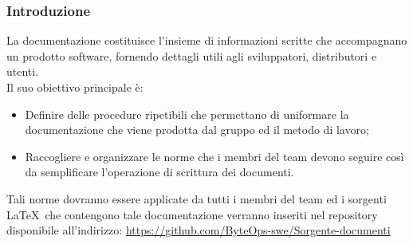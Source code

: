 \documentclass{article}
\begin{document}
    \subsubsection{Introduzione}
    La documentazione costituisce l'insieme di informazioni scritte che accompagnano un prodotto software, fornendo dettagli utili agli sviluppatori, distributori e utenti.\\
    Il suo obiettivo principale è:
    \begin{itemize}
    \item  Definire delle procedure ripetibili che permettano di uniformare la documentazione che viene prodotta dal gruppo ed il metodo di lavoro;
    \item  Raccogliere e organizzare le norme che i membri del team devono seguire così da semplificare l'operazione di scrittura dei documenti.
    \end{itemize}
    Tali norme dovranno essere applicate da tutti i membri del team ed i sorgenti \LaTeX\ che contengono tale documentazione verranno inseriti nel repository disponibile all'indirizzo:
    \href{https://github.com/ByteOps-swe/Sorgente-documenti}{https://github.com/ByteOps-swe/Sorgente-documenti}
    

\end{document}

